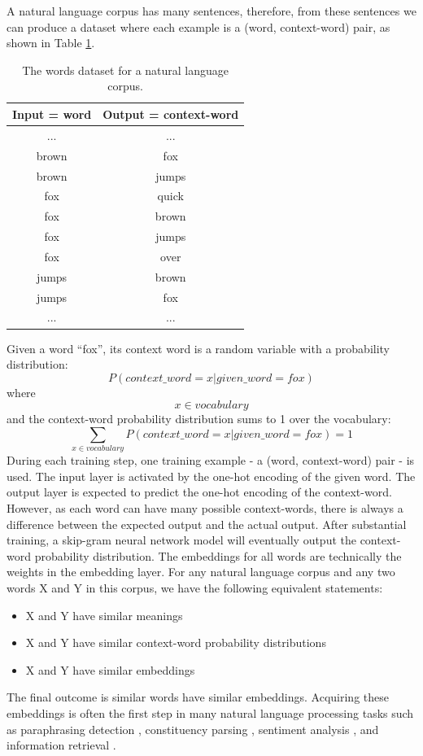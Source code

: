 \documentclass[12pt]{WSUThesis}
\theoremstyle{definition}
\begin{document}
A natural language corpus has many sentences,
therefore, from these sentences we can produce a dataset where each example is a (word, context-word) pair,
as shown in Table \ref{tab:words}.
\begin{table}[!ht]
	\centering
	\caption{The words dataset for a natural language corpus.}
	\begin{tabular}{cc} \hline \rowcolor{blue!30}
		Input = word & Output = context-word \\ \hline
		... & ...       \\ \hline
		brown & fox \\ \hline
		brown & jumps \\ \hline
		fox & quick \\ \hline
		fox & brown \\ \hline
		fox & jumps \\ \hline
		fox & over \\ \hline
		jumps & brown \\ \hline
		jumps & fox \\ \hline
		... & ...       \\ \hline
	\end{tabular}
	\label{tab:words}
\end{table}
Given a word ``fox'', its context word is a random variable with a probability distribution:
\[P(context\_word = x | given\_word = fox)\]
where
\[x \in vocabulary\]
and the context-word probability distribution sums to 1 over the vocabulary:
\[ \sum_{x \in vocabulary}P(context\_word = x | given\_word = fox) = 1 \]
During each training step, one training example - a (word, context-word) pair - is used.
The input layer is activated by the one-hot encoding of the given word.
The output layer is expected to predict the one-hot encoding of the context-word.
However, as each word can have many possible context-words, there is always a difference between the expected output and the actual output.
After substantial training, a skip-gram neural network model will eventually output the context-word probability distribution.
The embeddings for all words are technically the weights in the embedding layer.
For any natural language corpus and any two words X and Y in this corpus, we have the following equivalent statements:
\begin{itemize}
	\item X and Y have similar meanings
	\item X and Y have similar context-word probability distributions
	\item X and Y have similar embeddings
\end{itemize}
The final outcome is similar words have similar embeddings.
Acquiring these embeddings is often the first step in many natural language processing tasks such as paraphrasing detection \cite{socher2012deep}, constituency parsing \cite{socher2013parsing},
sentiment analysis \cite{socher2013recursive}, and
information retrieval \cite{shen2014latent}.
\end{document}
